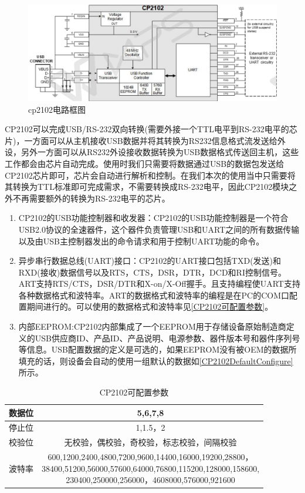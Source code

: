 \begin{figure}[!h]
\centering
\includegraphics[width=1.0\textwidth]{./graphics/cp2102-circuit-diagram.pdf}
\caption{cp2102电路框图}\label{fig:cp2102电路框图}
\end{figure}

	CP2102可以完成USB/RS-232双向转换(需要外接一个TTL电平到RS-232电平的芯片)，一方面可以从主机接收USB数据并将其转换为RS232信息格式流发送给外设，另外一方面可以从RS232外设接收数据转换为USB数据格式传送回主机，这些工作都会由芯片自动完成。使用时我们只需要将数据通过USB的数据包发送给CP2102芯片即可，芯片会自动进行解析和控制。在我们本次的使用当中只需要将其转换为TTL标准即可完成需求，不需要转换成RS-232电平，因此CP2102模块之外不再需要额外的转换为RS-232电平的芯片。
		
\begin{enumerate}
\item CP2102的USB功能控制器和收发器：CP2102的USB功能控制器是一个符合USB2.0协议的全速器件，这个器件负责管理USB和UART之间的所有数据传输以及由USB主控制器发出的命令请求和用于控制UART功能的命令。
\item 异步串行数据总线(UART)接口：CP2102的UART接口包括TXD(发送)和RXD(接收)数据信号以及RTS，CTS，DSR，DTR，DCD和RI控制信号。ART支持RTS/CTS，DSR/DTR和X-on/X-Off握手。且支持编程使UART支持各种数据格式和波特率。ART的数据格式和波特率的编程是在PC的COM口配置期间进行的。可以使用的数据格式和波特率见\autoref{CP2102可配置参数}。
\item 内部EEPROM:CP2102内部集成了一个EEPROM用于存储设备原始制造商定义的USB供应商ID、产品ID、产品说明、电源参数、器件版本号和器件序列号等信息\cite{CP2102}。USB配置数据的定义是可选的，如果EEPROM没有被OEM的数据所填充的话，则设备会自动的使用一组默认的数据如\autoref{CP2102DefaultConfigure}所示。
\end{enumerate}

\begin{table}[!h]
\centering
\begin{tabular}{|c|c|}
\hline
{数据位} & {5,6,7,8} \\
\hline
{停止位} & {1,1.5，2} \\
\hline
{校验位} & {无校验，偶校验，奇校验，标志校验，间隔校验} \\
\hline
{波特率} & \tabincell{c}{600,1200,2400,4800,7200,9600,14400,16000,19200,28800，\\ 38400,51200,56000,57600,64000,76800,115200,128000,158600,\\ 230400,250000,256000，4608000,576000,921600}\\
\hline
\end{tabular} 
\caption{CP2102可配置参数}\label{CP2102可配置参数}
\end{table}

